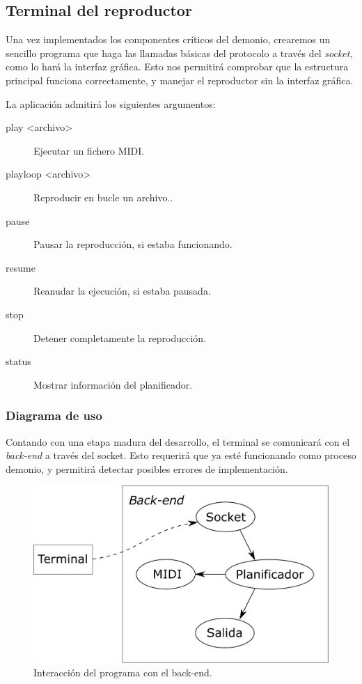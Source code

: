 \smallskip

\subsection{Terminal del reproductor}

Una vez implementados los componentes críticos del demonio, crearemos un sencillo programa que haga las llamadas básicas del protocolo a través del \textit{socket}, como lo hará la interfaz gráfica. Esto nos permitirá comprobar que la estructura principal funciona correctamente, y manejar el reproductor sin la interfaz gráfica.

La aplicación admitirá los siguientes argumentos:

\begin{description}
	\item[play <archivo>] Ejecutar un fichero \acrshort{MIDI}.
	\item[playloop <archivo>] Reproducir en bucle un archivo..
	\item[pause] Pausar la reproducción, si estaba funcionando.
	\item[resume] Reanudar la ejecución, si estaba pausada.
	\item[stop] Detener completamente la reproducción.
	\item[status] Mostrar información del planificador.
\end{description}

\subsubsection{Diagrama de uso}

Contando con una etapa madura del desarrollo, el terminal se comunicará con el \textit{back-end} a través del socket. Esto requerirá que ya esté funcionando como proceso demonio, y permitirá detectar posibles errores de implementación.

\smallskip

\begin{figure}[H]
	\noindent \begin{centering}
		\includegraphics[width=\linewidth/2]{capitulo4/terminal}
		\par\end{centering}
	\smallskip
	\caption{\label{fig:terminal} Interacción del programa con el back-end.}
\end{figure} 

